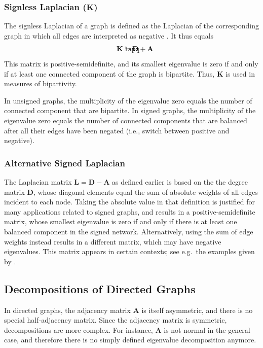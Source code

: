 \documentclass{article}
\def\mathnote#1{%
  \tag*{\rlap{\hspace\marginparsep\smash{\parbox[t]{\marginparwidth}{#1}}}}
}
\begin{document}
\subsubsection{Signless Laplacian ($\mathbf K$)}
The signless Laplacian of a graph is defined as the Laplacian of the
corresponding graph in which all edges are interpreted as negative \citep{b900}.  It
thus equals
\begin{align}
  \mathnote{\texttt{lapq}}
  \mathbf K &= \mathbf D + \mathbf A
\end{align}
This matrix is positive-semidefinite, and its smallest eigenvalue is
zero if and only if at least one connected component of the graph is bipartite.  Thus, $\mathbf K$ is used
in measures of bipartivity. 

In unsigned graphs, the multiplicity of the eigenvalue zero equals the
number of connected component that are bipartite.  
In signed graphs, the multiplicity of the eigenvalue zero equals the
number of connected components that are balanced after all their edges
have been negated (i.e., switch between positive and negative). 

\subsubsection{Alternative Signed Laplacian}
The Laplacian matrix $\mathbf L = \mathbf D - \mathbf A$ as defined
earlier is based on the the degree matrix $\mathbf D$, whose diagonal
elements equal the sum of absolute weights of all edges incident to each
node.  
Taking the absolute value in that definition is justified for
many applications related to signed graphs, and results in a positive-semidefinite matrix, whose
smallest eigenvalue is zero if and only if there is at least one
balanced component in the signed network.  Alternatively, using the sum
of edge weights instead results in a different matrix, which may have
negative eigenvalues.  This matrix appears in certain contexts; see
e.g.\ the examples given by \cite{b875}. 

\subsection{Decompositions of Directed Graphs}
In directed graphs, the adjacency matrix $\mathbf A$ is itself
asymmetric, and there is no special half-adjacency matrix.  Since the
adjacency matrix is symmetric, decompositions are more complex.  For
instance, $\mathbf A$ is not normal in the general case, and therefore
there is no simply defined eigenvalue decomposition anymore. 
\end{document}
